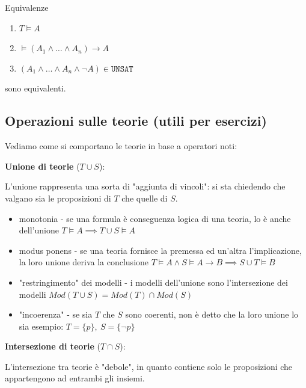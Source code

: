 \documentclass[a4paper,11pt]{report}
\begin{document}
\newpage

\begin{lemmaframe}{Equivalenze}{}
    \begin{enumerate}
        \item \( T \vDash A \)
        \item \( \vDash (A_1 \land \dots \land A_n) \to A \)
        \item \( (A_1 \land \dots \land A_n \land \neg A) \in \texttt{UNSAT}\) 
    \end{enumerate}

    sono equivalenti.

\end{lemmaframe}


\subsection*{Operazioni sulle teorie (utili per esercizi)}

Vediamo come si comportano le teorie in base a operatori noti:

\textbf{Unione di teorie} (\( T \cup S \)):

L'unione rappresenta una sorta di "aggiunta di vincoli": si sta chiedendo che valgano sia le proposizioni di \( T \) che quelle di \( S \).
\begin{itemize}
    \item monotonia - se una formula è conseguenza logica di una teoria, lo è anche dell'unione
        \subitem \( T\vDash A \implies T\cup S \vDash A \)

    \item modus ponens - se una teoria fornisce la premessa ed un'altra l'implicazione, la loro unione deriva la conclusione
        \subitem \( T \vDash A \land S \vDash A \to B \implies S \cup T \vDash B \)

    \item "restringimento" dei modelli - i modelli dell'unione sono l'intersezione dei modelli
        \subitem \( Mod(T \cup S) = Mod(T)\cap Mod(S) \)

    \item "incoerenza" - se sia \( T \) che \( S \) sono coerenti, non è detto che la loro unione lo sia
        \subitem esempio: \( T = \{p\}, \ S = \{\neg p\} \)
\end{itemize}

\textbf{Intersezione di teorie} (\( T \cap S \)):

L'intersezione tra teorie è "debole", in quanto contiene solo le proposizioni che appartengono ad entrambi gli insiemi.
\end{document}
